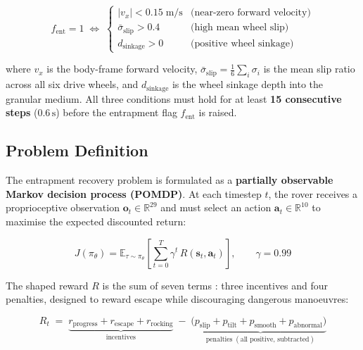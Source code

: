 \documentclass[12pt,a4paper]{article}
\begin{document}
\begin{tcolorbox}[dashedbox]
\begin{equation}
    f_{\text{ent}} = 1 \;\iff\;
    \begin{cases}
        |v_x| < 0.15\;\text{m/s} & \text{(near-zero forward velocity)} \\[4pt]
        \bar{\sigma}_{\text{slip}} > 0.4 & \text{(high mean wheel slip)} \\[4pt]
        d_{\text{sinkage}} > 0 & \text{(positive wheel sinkage)}
    \end{cases}
    \label{eq:entrapment_definition}
\end{equation}
\end{tcolorbox}

\noindent where $v_x$ is the body-frame forward velocity, $\bar{\sigma}_{\text{slip}} = \frac{1}{6}\sum_i \sigma_i$ is the mean slip ratio across all six drive wheels, and $d_{\text{sinkage}}$ is the wheel sinkage depth into the granular medium. All three conditions must hold for at least \textbf{15 consecutive steps} ($0.6\,\text{s}$) before the entrapment flag $f_{\text{ent}}$ is raised.

\subsection{Problem Definition}

The entrapment recovery problem is formulated as a \textbf{partially observable Markov decision process (POMDP)}. At each timestep $t$, the rover receives a proprioceptive observation $\mathbf{o}_t \in \mathbb{R}^{29}$ and must select an action $\mathbf{a}_t \in \mathbb{R}^{10}$ to maximise the expected discounted return:
\begin{tcolorbox}[dashedbox]
\begin{equation}
    J(\pi_\theta) = \mathbb{E}_{\tau \sim \pi_\theta}
    \left[ \sum_{t=0}^{T} \gamma^t\, R(\mathbf{s}_t, \mathbf{a}_t) \right], \qquad \gamma = 0.99
    \label{eq:objective}
\end{equation}
\end{tcolorbox}

The shaped reward $R$ is the sum of seven terms : three incentives and four penalties, designed to reward escape while discouraging dangerous manoeuvres:

\begin{tcolorbox}[dashedbox]
\begin{equation}
    R_t \;=\; \underbrace{r_{\text{progress}} + r_{\text{escape}} + r_{\text{rocking}}}_{\text{incentives}}
          \;-\; (\underbrace{p_{\text{slip}} + p_{\text{tilt}} + p_{\text{smooth}} + p_{\text{abnormal}})}_{\text{penalties} \;(\text{all positive, subtracted})}
    \label{eq:reward_total}
\end{equation}
\end{tcolorbox}
\end{document}
